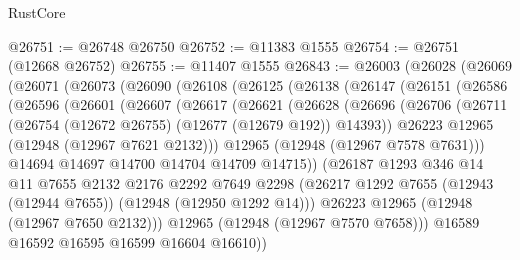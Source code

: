\begin{lexlean}{RustCore}
\begin{coremodule}
@26751 := @26748 @26750
@26752 := @11383 @1555
@26754 := @26751 (@12668 @26752)
@26755 := @11407 @1555
@26843 := @26003
    (@26028
      (@26069
        (@26071
          (@26073
            (@26090
              (@26108
                (@26125
                  (@26138
                    (@26147
                      (@26151
                        (@26586
                          (@26596
                            (@26601
                              (@26607
                                (@26617
                                  (@26621
                                    (@26628
                                      (@26696
                                        (@26706
                                          (@26711
                                            (@26754 (@12672 @26755) (@12677 (@12679 @192)) @14393))
                                          @26223
                                          @12965
                                          (@12948 (@12967 @7621 @2132)))
                                        @12965
                                        (@12948 (@12967 @7578 @7631)))
                                      @14694
                                      @14697
                                      @14700
                                      @14704
                                      @14709
                                      @14715))
                                  (@26187
                                    @1293
                                    @346
                                    @14
                                    @11
                                    @7655
                                    @2132
                                    @2176
                                    @2292
                                    @7649
                                    @2298
                                    (@26217
                                      @1292
                                      @7655
                                      (@12943 (@12944 @7655))
                                      (@12948 (@12950 @1292 @14)))
                                    @26223
                                    @12965
                                    (@12948 (@12967 @7650 @2132)))
                                  @12965
                                  (@12948 (@12967 @7570 @7658)))
                                @16589
                                @16592
                                @16595
                                @16599
                                @16604
                                @16610))

\end{coremodule}
\end{lexlean}
